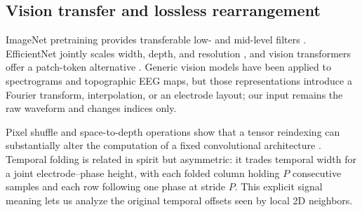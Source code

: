 \subsection{Vision transfer and lossless rearrangement}

ImageNet pretraining provides transferable low- and mid-level filters
\citep{deng2009imagenet}. EfficientNet jointly scales width, depth, and
resolution \citep{tan2019efficientnet}, and vision transformers offer a
patch-token alternative \citep{dosovitskiy2021vit}. Generic vision models have
been applied to spectrograms and topographic EEG maps, but those
representations introduce a Fourier transform, interpolation, or an electrode
layout; our input remains the raw waveform and changes indices only.

Pixel shuffle and space-to-depth operations show that a tensor reindexing can
substantially alter the computation of a fixed convolutional architecture
\citep{shi2016realtime}. Temporal folding is related in spirit but asymmetric:
it trades temporal width for a joint electrode--phase height, with each folded
column holding $P$ consecutive samples and each row following one phase at
stride $P$. This explicit signal meaning lets us analyze the original temporal
offsets seen by local 2D neighbors.
